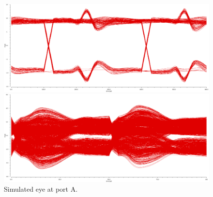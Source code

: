 \documentclass{book}  %
\begin{document}
\begin{paper}
\begin{figure}[htbp!]
	\captionsetup[subfigure]{justification=centering}
	\begin{minipage}[tb]{0.5\textwidth}
		\centering	
		\includegraphics[width=\textwidth]{./img/channel_response_eye_diagram/3gbp_eye_total_before_channel.png}
	\end{minipage}%
	\begin{minipage}[tb]{0.5\textwidth}
		\centering	
		\includegraphics[width=\textwidth]{./img/channel_response_eye_diagram/20gbp_eye_total_before_channel.png}
	\end{minipage}%
	\label{fig:eye_total_port_A}
	\caption{Simulated eye at port A.}
\end{figure}


\end{paper}
\end{document}
